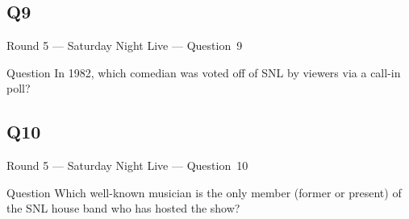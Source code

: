 \documentclass[11pt]{beamer}
\begin{document}
\subsection*{Q9}
\begin{frame}[t]{Round 5 --- Saturday Night Live --- \mbox{Question 9}}
\vspace{-0.5em}
\begin{block}{Question}
In 1982, which comedian was voted off of SNL by viewers via a call-in poll?
\end{block}
\end{frame}
\subsection*{Q10}
\begin{frame}[t]{Round 5 --- Saturday Night Live --- \mbox{Question 10}}
\vspace{-0.5em}
\begin{block}{Question}
Which well-known musician is the only member (former or present) of the SNL house band who has hosted the show?
\end{block}
\end{frame}
\end{document}
